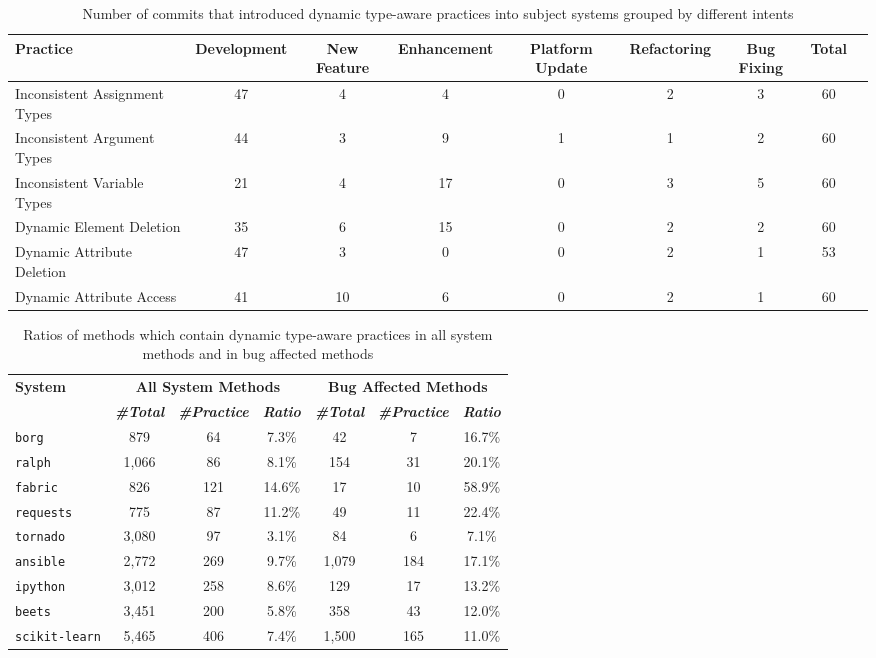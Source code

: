 \begin{table*}[ht]
	\caption{Number of commits that introduced dynamic type-aware practices into subject systems grouped by different intents}
	\centering
	\vspace{-10pt}
	\label{tab:introduction}
	\begin{tabular}{lcccccccc}
		\hline
		\textbf{Practice} &\textbf{Development} & \textbf{New Feature}&\textbf{Enhancement}&\textbf{Platform Update}&\textbf{Refactoring}&\textbf{Bug Fixing} & \textbf{Total}\\
		\hline
		Inconsistent Assignment Types&47& 4 &4 &0& 2&3&60\\
		Inconsistent Argument Types&44 &3& 9 &1 &1 &2&60\\
		Inconsistent Variable Types&21 &4 &17 &0& 3& 5&60\\
		Dynamic Element Deletion&35& 6 &15 &0 &2& 2&60\\
		Dynamic Attribute Deletion&47& 3 &0 &0& 2 &1 &53\\
		Dynamic Attribute Access&41&10&6 &0& 2 &1&60\\		
		\hline
	\end{tabular}
\end{table*}

\begin{table}[htbp]
	\centering
	\setlength{\tabcolsep}{3.6pt}
	\caption{Ratios of methods which contain dynamic type-aware practices in all system methods and in bug affected methods}
	\vspace{-10pt}
	\label{tab:bug}
	\begin{tabular}{lcccccc}
		\hline
		\multirow{2}{*}{\textbf{System}}&\multicolumn{3}{c}{\textbf{All System Methods}} &\multicolumn{3}{c}{\textbf{Bug Affected Methods}}\\
		\cmidrule(lr){2-4}  \cmidrule(lr){5-7} 
		& \textbf{\textit{\#Total}}& \textbf{\textit{\#Practice}}& \textbf{\textit{Ratio}} & \textbf{\textit{\#Total}}& \textbf{\textit{\#Practice}}& \textbf{\textit{Ratio}} \\
		\hline
		{\tt borg} &879&64	&7.3\%&42&7	&16.7\%\\
		{\tt ralph} &1,066&86&8.1\%&154&31	& 20.1\%\\
		{\tt fabric} &826&121&14.6\%&17&10	&58.9\%	\\
		{\tt requests} &775&87&11.2\%&49&11&22.4\%	\\	
		{\tt  tornado} &3,080&97 &3.1\%&84&6	&7.1\%\\
		{\tt ansible} &2,772&269&9.7\%&1,079&184	&17.1\%\\
		{\tt ipython}&3,012&258&8.6\%&129&17&	13.2\%\\	
		{\tt beets} &3,451&200&5.8\%&358&43 & 12.0\%\\
		{\tt scikit-learn} &5,465&406&7.4\%&1,500&165&	11.0\%\\
		\hline
	\end{tabular}
\end{table}


